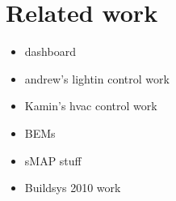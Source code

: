\section{Related work}

\begin{itemize}
\item dashboard
\item andrew's lightin control work
\item Kamin's hvac control work
\item BEMs
\item sMAP stuff
\item Buildsys 2010 work~\cite{hbci}
\end{itemize}